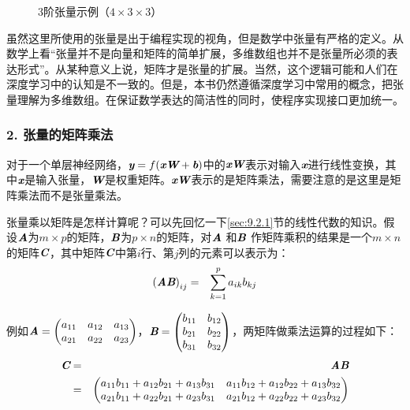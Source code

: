 \begin{figure}[htp]
\centering

\caption{3阶张量示例（$4 \times 3 \times 3$）}
\label{fig:9-25}
\end{figure}

\parinterval 虽然这里所使用的张量是出于编程实现的视角，但是数学中张量有严格的定义。从数学上看“张量并不是向量和矩阵的简单扩展，多维数组也并不是张量所必须的表达形式”。从某种意义上说，矩阵才是张量的扩展。当然，这个逻辑可能和人们在深度学习中的认知是不一致的。但是，本书仍然遵循深度学习中常用的概念，把张量理解为多维数组。在保证数学表达的简洁性的同时，使程序实现接口更加统一。


\subsubsection{2. 张量的矩阵乘法}

\parinterval 对于一个单层神经网络，$ {\textbf{\em y}}=f({\textbf{\em x}}{\textbf{\em W}}+{\textbf{\em b}}) $中的${\textbf{\em x}}{\textbf{\em W}} $表示对输入${\textbf{\em x}} $进行线性变换，其中${\textbf{\em x}}$是输入张量，$ {\textbf{\em W}}$是权重矩阵。$ {\textbf{\em x}} {\textbf{\em W}} $表示的是矩阵乘法，需要注意的是这里是矩阵乘法而不是张量乘法。

\parinterval 张量乘以矩阵是怎样计算呢？可以先回忆一下\ref{sec:9.2.1}节的线性代数的知识。假设$ {\textbf{\em A}} $为$ m\times p $的矩阵，$ {\textbf{\em B}} $为$ p\times n $的矩阵，对${\textbf{\em A}} $ 和${\textbf{\em B}}$ 作矩阵乘积的结果是一个$ m\times n $的矩阵${\textbf{\em C}}$，其中矩阵${\textbf{\em C}}$中第$ i $行、第$ j $列的元素可以表示为：
\begin{eqnarray}
{({\textbf{\em A}}{\textbf{\em B}})}_{ij}&=&\sum_{k=1}^{p}{a_{ik}b_{kj}}
\label{eq:9-24}
\end{eqnarray}

\noindent 例如$ {\textbf{\em A}}= \begin{pmatrix} a_{11} & a_{12} & a_{13}\\a_{21} & a_{22} & a_{23}\end{pmatrix} $，$ {\textbf{\em B}}= \begin{pmatrix} b_{11} & b_{12}\\b_{21} & b_{22}\\b_{31} & b_{32}\end{pmatrix} $，两矩阵做乘法运算的过程如下：
\begin{eqnarray}
{\textbf{\em C}} & = & {\textbf{\em A}}{\textbf{\em B}} \nonumber \\
                & = & \begin{pmatrix} a_{11}b_{11}+a_{12}b_{21}+a_{13}b_{31} & a_{11}b_{12}+a_{12}b_{22}+a_{13}b_{32}\\a_{21}b_{11}+a_{22}b_{21}+a_{23}b_{31} & a_{21}b_{12}+a_{22}b_{22}+a_{23}b_{32}\end{pmatrix}
\label{eq:9-108}
\end{eqnarray}

